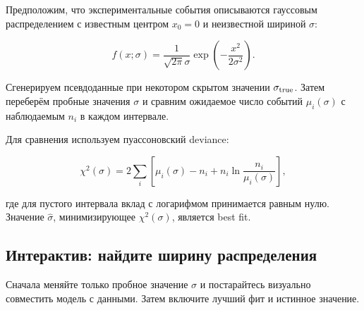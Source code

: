 \documentclass[
  russian,
  letterpaper,
]{scrbook}
\begin{document}
Предположим, что экспериментальные события описываются гауссовым
распределением с известным центром \(x_0=0\) и неизвестной шириной
\(\sigma\):

\[
f(x;\sigma)
=
\frac{1}{\sqrt{2\pi}\sigma}
\exp\!\left(-\frac{x^2}{2\sigma^2}\right).
\]

Сгенерируем псевдоданные при некотором скрытом значении
\(\sigma_{\rm true}\). Затем переберём пробные значения \(\sigma\) и
сравним ожидаемое число событий \(\mu_i(\sigma)\) с наблюдаемым \(n_i\)
в каждом интервале.

Для сравнения используем пуассоновский deviance:

\[
\chi^2(\sigma)
=
2\sum_i
\left[
\mu_i(\sigma)-n_i
+n_i\ln\frac{n_i}{\mu_i(\sigma)}
\right],
\]

где для пустого интервала вклад с логарифмом принимается равным нулю.
Значение \(\widehat{\sigma}\), минимизирующее \(\chi^2(\sigma)\),
является best fit.

\subsection{Интерактив: найдите ширину
распределения}\label{ux438ux43dux442ux435ux440ux430ux43aux442ux438ux432-ux43dux430ux439ux434ux438ux442ux435-ux448ux438ux440ux438ux43dux443-ux440ux430ux441ux43fux440ux435ux434ux435ux43bux435ux43dux438ux44f}

Сначала меняйте только пробное значение \(\sigma\) и постарайтесь
визуально совместить модель с данными. Затем включите лучший фит и
истинное значение.
\end{document}
